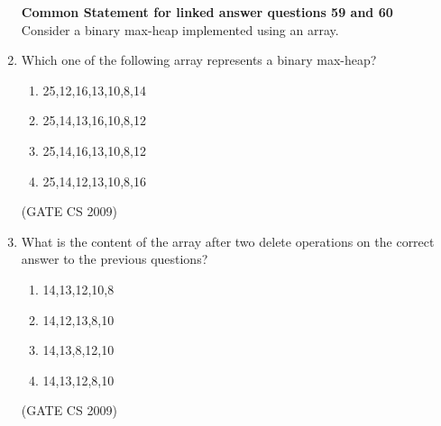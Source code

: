 \documentclass[a4paper, 11pt]{article}
\begin{document}
\begin{enumerate}
    {\Large \textbf{Common Statement for linked answer questions 59 and 60}} \\    
    Consider a binary max-heap implemented using an array.
    \item Which one of the following array represents a binary max-heap?\\
        \begin{enumerate}[label=(\Alph*)]
            \item {25,12,16,13,10,8,14}
            \item {25,14,13,16,10,8,12}
            \item {25,14,16,13,10,8,12}
            \item {25,14,12,13,10,8,16}
        \end{enumerate}
    \hfill (GATE CS 2009)
    \item What is the content of the array after two delete operations on the correct answer to the previous questions?\\
        \begin{enumerate}[label=(\Alph*)]
            \item {14,13,12,10,8}
            \item {14,12,13,8,10}
            \item {14,13,8,12,10}
            \item {14,13,12,8,10}
        \end{enumerate}
    \hfill (GATE CS 2009)
    

    
\end{enumerate}
\end{document}
